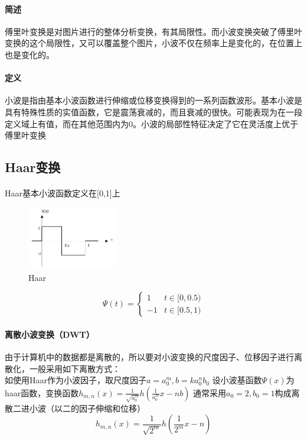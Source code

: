 \documentclass{article}
\begin{document}
        \paragraph{简述}傅里叶变换是对图片进行的整体分析变换，有其局限性。而小波变换突破了傅里叶变换的这个局限性，又可以覆盖整个图片，小波不仅在频率上是变化的，在位置上也是变化的。
        \paragraph{定义}小波是指由基本小波函数进行伸缩或位移变换得到的一系列函数波形。基本小波是具有特殊性质的实值函数，它是震荡衰减的，而且衰减的很快。可能表现为在一段定义域上有值，而在其他范围内为0。小波的局部性特征决定了它在灵活度上优于傅里叶变换
        \subsection{Haar变换}
        \paragraph{}
        Haar基本小波函数定义在[0,1]上
        \begin{figure}[htbp!]
                \begin{minipage}[t]{1\linewidth}\centering
                \includegraphics[width=4cm]{haar.png}
                \caption{Haar}\label{1-a}
                \end{minipage}
        \end{figure}
        \begin{equation*}
            \Psi(t)=
            \begin{cases}
            1 &\mbox{$t \in [0,0.5)$}\\
            -1 &\mbox{$t \in [0.5,1)$}
            \end{cases}
        \end{equation*}
        \paragraph{离散小波变换（DWT）}
        由于计算机中的数据都是离散的，所以要对小波变换的尺度因子、位移因子进行离散化，一般采用如下离散方式：\\
        如使用Haar作为小波因子，取尺度因子$a=a_{0}^{m},b=ka_{0}^{n}b_{0}$
        设小波基函数$\Psi(x)$为haar函数，变换函数$h_{m,n}(x)=\frac{1}{\sqrt{a_{0}^{m}}}h(\frac{1}{a_{0}^{m}}x-nb)$
        通常采用$a_0=2,b_0=1$构成离散二进小波（以二的因子伸缩和位移）
        \begin{equation*}
        h_{m,n}(x)=\frac{1}{\sqrt{2^{m}}}h(\frac{1}{2^{m}}x-n)
        \end{equation*}
\end{document}
